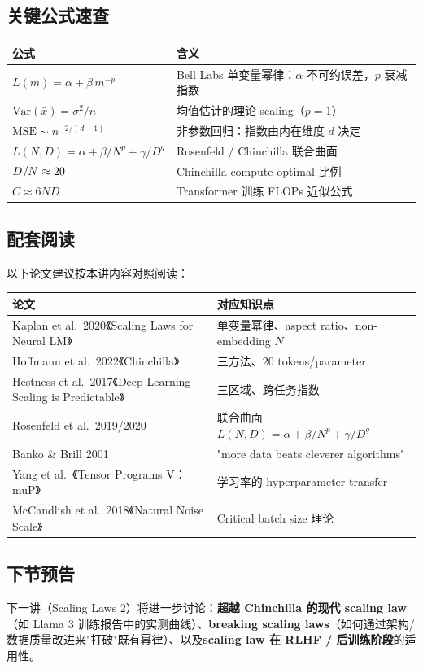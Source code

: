 \documentclass[a4paper]{article}
\begin{document}
\subsection{关键公式速查}

\begin{tabular}{p{6cm}p{7cm}}
\toprule
\textbf{公式} & \textbf{含义} \\
\midrule
$L(m)=\alpha+\beta\,m^{-p}$ & Bell Labs 单变量幂律：$\alpha$ 不可约误差，$p$ 衰减指数 \\
$\mathrm{Var}(\bar{x})=\sigma^2/n$ & 均值估计的理论 scaling（$p=1$） \\
$\text{MSE}\sim n^{-2/(d+1)}$ & 非参数回归：指数由内在维度 $d$ 决定 \\
$L(N,D)=\alpha+\beta/N^p+\gamma/D^q$ & Rosenfeld / Chinchilla 联合曲面 \\
$D^{\*}/N^{\*}\approx 20$ & Chinchilla compute-optimal 比例 \\
$C\approx 6ND$ & Transformer 训练 FLOPs 近似公式 \\
\bottomrule
\end{tabular}

\subsection{配套阅读}

以下论文建议按本讲内容对照阅读：

\begin{tabular}{p{7cm}p{6cm}}
\toprule
\textbf{论文} & \textbf{对应知识点} \\
\midrule
Kaplan et al.\ 2020《Scaling Laws for Neural LM》 & 单变量幂律、aspect ratio、non-embedding $N$ \\
Hoffmann et al.\ 2022《Chinchilla》 & 三方法、20 tokens/parameter \\
Hestness et al.\ 2017《Deep Learning Scaling is Predictable》 & 三区域、跨任务指数 \\
Rosenfeld et al.\ 2019/2020 & 联合曲面 $L(N,D)=\alpha+\beta/N^p+\gamma/D^q$ \\
Banko \& Brill 2001 & "more data beats cleverer algorithms" \\
Yang et al.\ 《Tensor Programs V：muP》 & 学习率的 hyperparameter transfer \\
McCandlish et al.\ 2018《Natural Noise Scale》 & Critical batch size 理论 \\
\bottomrule
\end{tabular}

\subsection{下节预告}

下一讲（Scaling Laws 2）将进一步讨论：\textbf{超越 Chinchilla 的现代 scaling law}（如 Llama 3 训练报告中的实测曲线）、\textbf{breaking scaling laws}（如何通过架构/数据质量改进来"打破"既有幂律）、以及\textbf{scaling law 在 RLHF / 后训练阶段}的适用性。

\end{document}
